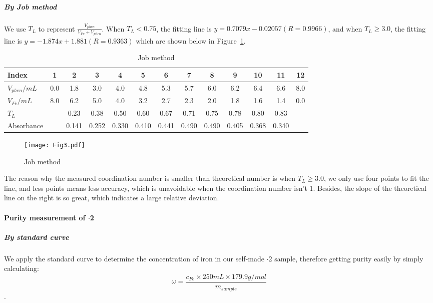 \documentclass[journal=jacsat,manuscript=article]{achemso}
\begin{document}
\subparagraph{By Job method}

We use $T_L$ to represent $\frac{V_{phen}}{V_{Fe}+V_{phen}}$. When $T_L<0.75$, the fitting line is $y=0.7079x-0.02057(R=0.9966)$, and when $T_L\geq3.0$, the fitting line is $y=-1.874x+1.881(R=0.9363)$ which are shown below in Figure~\ref{fig3}.

\begin{table}[H]
    \caption{Job method}
    \label{tab.Jbm}
    \begin{tabular}{lcccccccccccc}
    \toprule
    Index
    & 1 & 2 & 3 & 4 & 5 & 6 & 7 & 8 & 9 & 10& 11& 12\\
    \midrule
    $V_{phen}/mL$
    &0.0&1.8&3.0&4.0&4.8&5.3&5.7&6.0&6.2&6.4&6.6&8.0\\
    $V_{Fe}/mL$
    &8.0&6.2&5.0&4.0&3.2&2.7&2.3&2.0&1.8&1.6&1.4&0.0\\
    $T_L$
    &   &0.23&0.38&0.50&0.60&0.67&0.71&0.75&0.78&0.80&0.83& \\
    Absorbance
    &   &0.141&0.252&0.330&0.410&0.441&0.490&0.490&0.405&0.368&0.340& \\
    \bottomrule
    \end{tabular}
\end{table}

\begin{figure}[H]
    \texttt{[image: Fig3.pdf]}
    \caption{Job method}
    \label{fig3}
\end{figure}

The reason why the measured coordination number is smaller than theoretical number is when $T_L\geq3.0$, we only use four points to fit the line, and less points means less accuracy, which is unavoidable when the coordination number isn't 1. Besides, the slope of the theoretical line on the right is so great, which indicates a large relative deviation.

\paragraph{Purity measurement of $\cdot$2}

\subparagraph{By standard curve}
We apply the standard curve to determine the concentration of iron in our self-made $\cdot$2 sample, therefore getting purity easily by simply calculating: \[\omega=\frac{c_{Fe}\times250mL\times179.9 g/mol}{m_{sample}}\].
\end{document}
